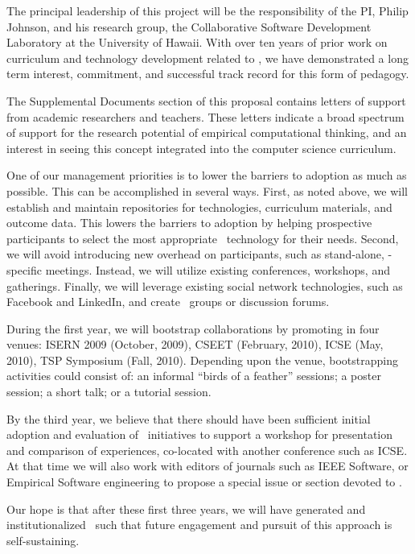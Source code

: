The principal leadership of this project will be the responsibility of the
PI, Philip Johnson, and his research group, the Collaborative Software
Development Laboratory at the University of Hawaii.  With over ten years of
prior work on curriculum and technology development related to \eCT, we have
demonstrated a long term interest, commitment, and successful track record
for this form of pedagogy.

The Supplemental Documents section of this proposal contains letters of
support from academic researchers and teachers.  These letters indicate a
broad spectrum of support for the research potential of empirical
computational thinking, and an interest in seeing this concept integrated
into the computer science curriculum.

One of our management priorities is to lower the barriers to adoption as
much as possible.  This can be accomplished in several ways. First, as
noted above, we will establish and maintain repositories for technologies,
curriculum materials, and outcome data.  This lowers the barriers to
adoption by helping prospective participants to select the most appropriate
\eCT\ technology for their needs.  Second, we will avoid introducing new
overhead on participants, such as stand-alone, \eCT-specific
meetings. Instead, we will utilize existing conferences, workshops, and
gatherings.  Finally, we will leverage existing social network
technologies, such as Facebook and LinkedIn, and create \eCT\ groups or
discussion forums.

During the first year, we will bootstrap collaborations by promoting \eCT
in four venues: ISERN 2009 (October, 2009), CSEET (February, 2010), ICSE
(May, 2010), TSP Symposium (Fall, 2010). Depending upon the venue,
bootstrapping activities could consist of: an informal ``birds of a
feather'' sessions; a poster session; a short talk; or a tutorial session.  

By the third year, we believe that there should have been sufficient
initial adoption and evaluation of \eCT\ initiatives to support a workshop
for presentation and comparison of experiences, co-located with another
conference such as ICSE.  At that time we will also work with editors of
journals such as IEEE Software, or Empirical Software engineering to
propose a special issue or section devoted to \eCT.

Our hope is that after these first three years, we will have generated and 
institutionalized \eCT\ such that future engagement and pursuit of this 
approach is self-sustaining. 

